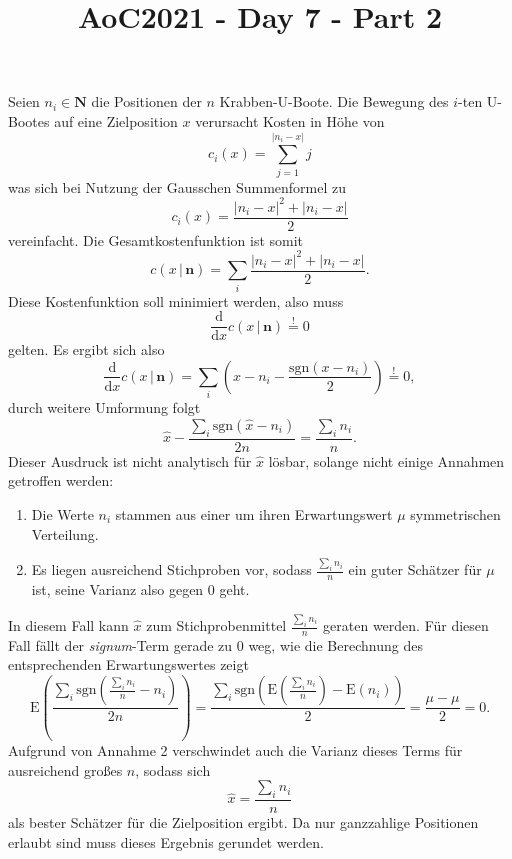 \documentclass[fleqn,usenatbib]{scrartcl}
\title{AoC2021 - Day 7 - Part 2}
\begin{document}
\maketitle
Seien $n_{i} \in \mathbf{N}$ die Positionen der $n$ Krabben-U-Boote.
Die Bewegung des $i$-ten U-Bootes auf eine Zielposition $x$ verursacht Kosten in Höhe von 
\begin{equation*}
    c_{i}(x) = \sum_{j = 1}^{|n_{i} - x|} j
\end{equation*}
was sich bei Nutzung der Gausschen Summenformel zu 
\begin{equation*}
    c_{i}(x) = \frac{|n_{i} - x|^{2} + |n_{i} - x|}{2}
\end{equation*}
vereinfacht. Die Gesamtkostenfunktion ist somit
\begin{equation*}
    c(x \,|\, \mathbf{n}) = \sum_{i} \frac{|n_{i} - x|^{2} + |n_{i} - x|}{2}.
\end{equation*}
Diese Kostenfunktion soll minimiert werden, also muss
\begin{equation*}
\frac{\mathrm{d}}{\mathrm{d}x} c(x  \,|\, \mathbf{n}) \stackrel{!}{=} 0
\end{equation*}
gelten. Es ergibt sich also
\begin{equation*}
    \frac{\mathrm{d}}{\mathrm{d}x} c(x  \,|\, \mathbf{n}) = \sum_{i} \left( x - n_{i} - \frac{\mathrm{sgn}(x-n_{i})}{2}\right) \stackrel{!}{=} 0,
\end{equation*}
durch weitere Umformung folgt
\begin{equation}
    \hat{x} - \frac{\sum_{i} \mathrm{sgn}(\hat{x}-n_{i})}{2n} = \frac{\sum_{i} n_{i}}{n}.
    \label{eq1}
\end{equation}
Dieser Ausdruck ist nicht analytisch für $\hat{x}$ lösbar, solange nicht einige Annahmen getroffen werden:
\begin{enumerate}
    \item Die Werte $n_{i}$ stammen aus einer um ihren Erwartungswert $\mu$ symmetrischen Verteilung.
    \item Es liegen ausreichend Stichproben vor, sodass $\frac{\sum_{i} n_{i}}{n}$ ein guter Schätzer für $\mu$ ist, seine Varianz also gegen 0 geht.
\end{enumerate}
In diesem Fall kann $\hat{x}$ zum Stichprobenmittel $\frac{\sum_{i} n_{i}}{n}$ geraten werden. Für diesen Fall fällt der 
\textit{signum}-Term gerade zu 0 weg, wie die Berechnung des entsprechenden Erwartungswertes zeigt
\begin{equation*}
    \mathrm{E} \left( \frac{\sum_{i} \mathrm{sgn}(\frac{\sum_{i} n_{i}}{n} - n_{i})}{2n} \right) = 
    \frac{\sum_{i} \mathrm{sgn}\left(\mathrm{E} \left(\frac{\sum_{i} n_{i}}{n}\right)- \mathrm{E}(n_{i}) \right)}{2}
    = \frac{\mu - \mu}{2} = 0.
\end{equation*}
Aufgrund von Annahme 2 verschwindet auch die Varianz dieses Terms für ausreichend großes $n$, sodass sich 
\begin{equation*}
    \hat{x} = \frac{\sum_{i} n_{i}}{n}
\end{equation*}
als bester Schätzer für die Zielposition ergibt. Da nur ganzzahlige Positionen erlaubt sind muss dieses Ergebnis gerundet werden.
\end{document}
